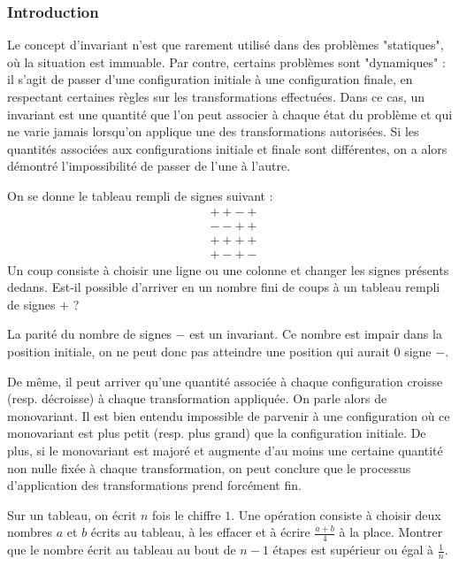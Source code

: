 
\subsubsection{Introduction}


Le concept d'invariant n'est que rarement utilisé dans des problèmes "statiques", où la situation est immuable. Par contre, certains problèmes sont "dynamiques" : il s'agit de passer d'une configuration initiale à une configuration finale, en respectant certaines règles sur les transformations effectuées. Dans ce cas, un invariant est une quantité que l'on peut associer à chaque état du problème et qui ne varie jamais lorsqu'on applique une des transformations autorisées. Si les quantités associées aux configurations initiale et finale sont différentes, on a alors démontré l'impossibilité de passer de l'une à l'autre.


\begin{exo}
On se donne le tableau rempli de signes suivant :
\begin{align*}
& ++-+\\
& --++\\
&++++\\
& +-+-
\end{align*}
Un coup consiste à choisir une ligne ou une colonne et changer les signes présents dedans. Est-il possible d'arriver en un nombre fini de coups à un tableau rempli de signes $+$ ?
\end{exo}


\begin{sol}
La parité du nombre de signes $-$ est un invariant. Ce nombre est impair dans la position initiale, on ne peut donc pas atteindre une position qui aurait $0$ signe $-$.
\end{sol}


De même, il peut arriver qu'une quantité associée à chaque configuration croisse (resp. décroisse) à chaque transformation appliquée. On parle alors de monovariant. Il est bien entendu impossible de parvenir à une configuration où ce monovariant est plus petit (resp. plus grand) que la configuration initiale. De plus, si le monovariant est majoré et augmente d'au moins une certaine quantité non nulle fixée à chaque transformation, on peut conclure que le processus d'application des transformations prend forcément fin.


\begin{exo}
Sur un tableau, on écrit $n$ fois le chiffre $1$. Une opération consiste à choisir deux nombres $a$ et $b$ écrits au tableau, à les effacer et à écrire $\frac{a+b}{4}$ à la place. Montrer que le nombre écrit au tableau au bout de $n-1$ étapes est supérieur ou égal à $\frac1{n}$.
\end{exo}


